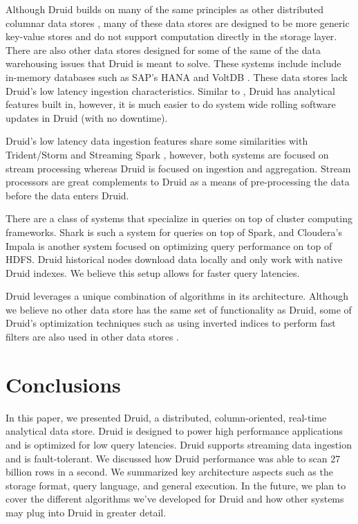 \documentclass{acm_proc_article-sp}
\begin{document}
Although Druid builds on many of the same principles as other distributed
columnar data stores \cite{fink2012distributed}, many of these data stores are
designed to be more generic key-value stores \cite{stonebraker2005c} and do not
support computation directly in the storage layer.  There are also other data
stores designed for some of the same of the data warehousing issues that Druid
is meant to solve. These systems include include in-memory databases such as
SAP’s HANA \cite{farber2012sap} and VoltDB \cite{voltdb2010voltdb}. These data
stores lack Druid's low latency ingestion characteristics. Similar to
\cite{paraccel2013}, Druid has analytical features built in, however, it is
much easier to do system wide rolling software updates in Druid (with no
downtime).  

Druid's low latency data ingestion features share some similarities with
Trident/Storm \cite{marz2013storm} and Streaming Spark
\cite{zaharia2012discretized}, however, both systems are focused on stream
processing whereas Druid is focused on ingestion and aggregation. Stream
processors are great complements to Druid as a means of pre-processing the data
before the data enters Druid.

There are a class of systems that specialize in queries on top of cluster
computing frameworks.  Shark \cite{engle2012shark} is such a system for queries
on top of Spark, and Cloudera's Impala \cite{cloudera2013} is another system
focused on optimizing query performance on top of HDFS. Druid historical nodes
download data locally and only work with native Druid indexes. We believe this
setup allows for faster query latencies.

Druid leverages a unique combination of algorithms in its
architecture. Although we believe no other data store has the same set
of functionality as Druid, some of Druid’s optimization techniques such as using
inverted indices to perform fast filters are also used in other data
stores \cite{macnicol2004sybase}.

\section{Conclusions}
\label{sec:conclusions}
In this paper, we presented Druid, a distributed, column-oriented, real-time
analytical data store. Druid is designed to power high performance applications
and is optimized for low query latencies. Druid supports streaming data
ingestion and is fault-tolerant. We discussed how Druid performance was able to
scan 27 billion rows in a second. We summarized key architecture aspects such
as the storage format, query language, and general execution. In the future, we
plan to cover the different algorithms we’ve developed for Druid and how other
systems may plug into Druid in greater detail.
\end{document}
